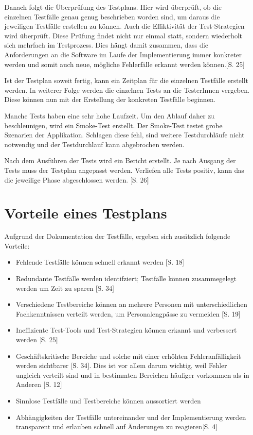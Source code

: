 \documentclass[a4paper,bibtotoc,oneside]{scrbook}
\begin{document}
Danach folgt die Überprüfung des Testplans. Hier wird überprüft, ob die einzelnen Testfälle genau genug beschrieben worden sind, um daraus die jeweiligen Testfälle erstellen zu können. Auch die Effiktivität der Test-Strategien wird überprüft. Diese Prüfung findet nicht nur einmal statt, sondern wiederholt sich mehrfach im Testprozess. Dies hängt damit zusammen, dass die Anforderungen an die Software im Laufe der Implementierung immer konkreter werden und somit auch neue, mögliche Fehlerfälle erkannt werden können.\cite{eval_regression}[S. 25]

Ist der Testplan soweit fertig, kann ein Zeitplan für die einzelnen Testfälle erstellt werden. In weiterer Folge werden die einzelnen Tests an die TesterInnen vergeben. Diese können nun mit der Erstellung der konkreten Testfälle beginnen.

Manche Tests haben eine sehr hohe Laufzeit. Um den Ablauf daher zu beschleunigen, wird ein Smoke-Test erstellt. Der Smoke-Test testet grobe Szenarien der Applikation. Schlagen diese fehl, sind weitere Testdurchläufe nicht notwendig und der Testdurchlauf kann abgebrochen werden.

Nach dem Ausführen der Tests wird ein Bericht erstellt. Je nach Ausgang der Tests muss der Testplan angepasst werden. Verliefen alle Tests positiv, kann das die jeweilige Phase abgeschlossen werden. \cite{eval_regression}[S. 26]


\section{Vorteile eines Testplans}

Aufgrund der Dokumentation der Testfälle, ergeben sich zusätzlich folgende Vorteile:

\begin{itemize}
	\item Fehlende Testfälle können schnell erkannt werden \cite{test_large_systems}[S. 18]
	\item Redundante Testfälle werden identifziert; Testfälle können zusammegelegt werden um Zeit zu sparen \cite{testing_apps_on_web}[S. 34]
	\item Verschiedene Testbereiche können an mehrere Personen mit unterschiedlichen Fachkenntnissen verteilt werden, um Personalengpässe zu vermeiden \cite{test_large_systems}[S. 19]
	\item Ineffiziente Test-Tools und Test-Strategien können erkannt und verbessert werden \cite{eval_regression}[S. 25]
	\item Geschäftskritische Bereiche und solche mit einer erhöhten  Fehleranfälligkeit werden sichtbarer \cite{testing_apps_on_web}[S. 34]. Dies ist vor allem darum wichtig, weil Fehler ungleich verteilt sind und in bestimmten Bereichen häufiger vorkommen als in Anderen \cite{eval_regression}[S. 12]
	\item Sinnlose Testfälle und Testbereiche können aussortiert werden
	\item Abhängigkeiten der Testfälle untereinander und der Implementierung werden transparent und erlauben schnell auf Änderungen zu reagieren\cite{test_auto}[S. 4]
\end{itemize}
\end{document}
